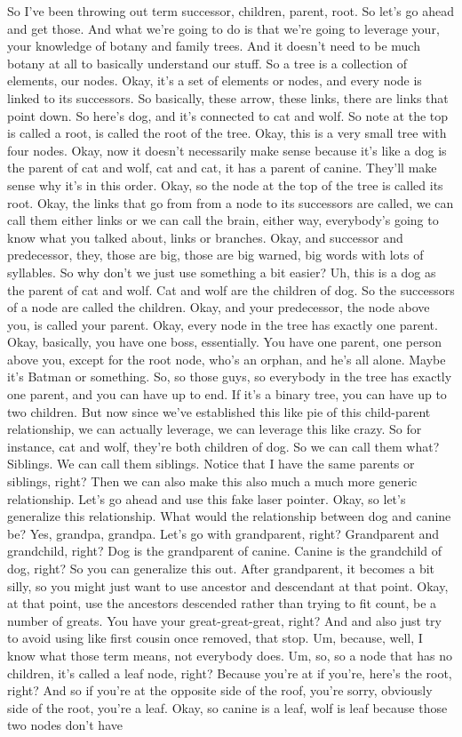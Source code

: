  So I've been throwing out term successor, children, parent, root. So let's go ahead and get those. And what we're going to do is that we're going to leverage your, your knowledge of botany and family trees. And it doesn't need to be much botany at all to basically understand our stuff. So a tree is a collection of elements, our nodes. Okay, it's a set of elements or nodes, and every node is linked to its successors. So basically, these arrow, these links, there are links that point down. So here's dog, and it's connected to cat and wolf. So note at the top is called a root, is called the root of the tree. Okay, this is a very small tree with four nodes. Okay, now it doesn't necessarily make sense because it's like a dog is the parent of cat and wolf, cat and cat, it has a parent of canine. They'll make sense why it's in this order. Okay, so the node at the top of the tree is called its root. Okay, the links that go from from a node to its successors are called, we can call them either links or we can call the brain, either way, everybody's going to know what you talked about, links or branches. Okay, and successor and predecessor, they, those are big, those are big warned, big words with lots of syllables. So why don't we just use something a bit easier? Uh, this is a dog as the parent of cat and wolf. Cat and wolf are the children of dog. So the successors of a node are called the children. Okay, and your predecessor, the node above you, is called your parent. Okay, every node in the tree has exactly one parent. Okay, basically, you have one boss, essentially. You have one parent, one person above you, except for the root node, who's an orphan, and he's all alone. Maybe it's Batman or something. So, so those guys, so everybody in the tree has exactly one parent, and you can have up to end. If it's a binary tree, you can have up to two children. But now since we've established this like pie of this child-parent relationship, we can actually leverage, we can leverage this like crazy. So for instance, cat and wolf, they're both children of dog. So we can call them what? Siblings. We can call them siblings. Notice that I have the same parents or siblings, right? Then we can also make this also much a much more generic relationship. Let's go ahead and use this fake laser pointer. Okay, so let's generalize this relationship. What would the relationship between dog and canine be? Yes, grandpa, grandpa. Let's go with grandparent, right? Grandparent and grandchild, right? Dog is the grandparent of canine. Canine is the grandchild of dog, right? So you can generalize this out. After grandparent, it becomes a bit silly, so you might just want to use ancestor and descendant at that point. Okay, at that point, use the ancestors descended rather than trying to fit count, be a number of greats. You have your great-great-great, right? And and also just try to avoid using like first cousin once removed, that stop. Um, because, well, I know what those term means, not everybody does. Um, so, so a node that has no children, it's called a leaf node, right? Because you're at if you're, here's the root, right? And so if you're at the opposite side of the roof, you're sorry, obviously side of the root, you're a leaf. Okay, so canine is a leaf, wolf is leaf because those two nodes don't have 